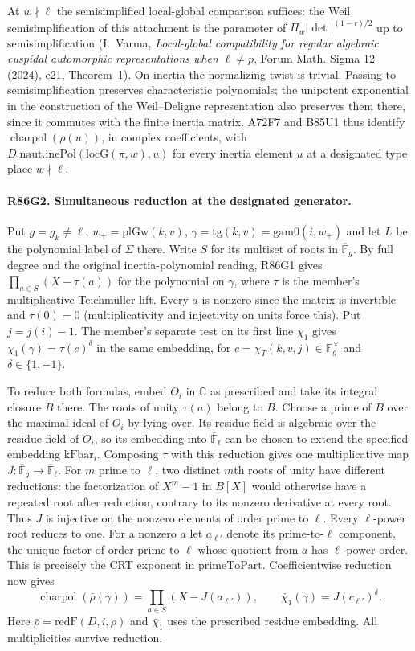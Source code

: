 At $w\nmid\ell$ the semisimplified local-global comparison suffices:
the Weil semisimplification of this attachment is the parameter of
$\Pi_w|\det|^{(1-r)/2}$ up to semisimplification
(I.~Varma, \emph{Local-global compatibility for regular algebraic
cuspidal automorphic representations when $\ell\ne p$},
Forum Math. Sigma 12 (2024), e21, Theorem~1).
On inertia the normalizing twist is trivial. Passing to
semisimplification preserves characteristic polynomials; the
unipotent exponential in the construction of the Weil--Deligne
representation also preserves them there, since it commutes with
the finite inertia matrix. A72F7 and B85U1 thus identify
$\operatorname{charpol}(\rho(u))$, in complex coefficients, with
$D.\mathrm{naut.inePol}(\mathrm{locG}(\pi,w),u)$ for every inertia
element $u$ at a designated type place $w\nmid\ell$.

\paragraph{R86G2. Simultaneous reduction at the designated generator.}
Put $g=g_k\ne\ell$, $w_+=\mathrm{plGw}(k,v)$,
$\gamma=\mathrm{tg}(k,v)=\mathrm{gam0}(i,w_+)$ and let $L$ be the
polynomial label of $\Sigma$ there. Write $S$ for its multiset of
roots in $\overline{\mathbb F}_g$. By full degree and the original
inertia-polynomial reading, R86G1 gives
$\prod_{a\in S}(X-\tau(a))$ for the polynomial on $\gamma$,
where $\tau$ is the member's multiplicative Teichm\"uller lift.
Every $a$ is nonzero since the matrix is invertible and
$\tau(0)=0$ (multiplicativity and injectivity on units force this).
Put $j=j(i)-1$. The member's separate test on its first line
$\chi_1$ gives $\chi_1(\gamma)=\tau(c)^{\delta}$ in the same
embedding, for $c=\chi_T(k,v,j)\in\mathbb F_g^\times$ and
$\delta\in\{1,-1\}$.

To reduce both formulas, embed $O_i$ in $\mathbb C$ as prescribed
and take its integral closure $B$ there. The roots of unity $\tau(a)$
belong to $B$. Choose a prime of $B$ over the maximal ideal of
$O_i$ by lying over. Its residue field is algebraic over the residue
field of $O_i$, so its embedding into $\overline{\mathbb F}_\ell$
can be chosen to extend the specified embedding $\mathrm{kFbar}_i$.
Composing $\tau$ with this reduction gives one multiplicative map
$J:\overline{\mathbb F}_g\to\overline{\mathbb F}_\ell$.
For $m$ prime to $\ell$, two distinct $m$th roots of unity have
different reductions: the factorization of $X^m-1$ in $B[X]$ would
otherwise have a repeated root after reduction, contrary to its
nonzero derivative at every root. Thus $J$ is injective on the
nonzero elements of order prime to $\ell$. Every $\ell$-power root
reduces to one. For a nonzero $a$ let $a_{\ell'}$ denote its
prime-to-$\ell$ component, the unique factor of order prime to
$\ell$ whose quotient from $a$ has $\ell$-power order. This is
precisely the CRT exponent in $\mathrm{primeToPart}$. Coefficientwise
reduction now gives
\[
 \operatorname{charpol}(\bar\rho(\gamma))
       =\prod_{a\in S}(X-J(a_{\ell'})),\qquad
 \bar\chi_1(\gamma)=J(c_{\ell'})^\delta.
\]
Here $\bar\rho=\mathrm{redF}(D,i,\rho)$ and $\bar\chi_1$ uses
the prescribed residue embedding. All multiplicities survive reduction.

